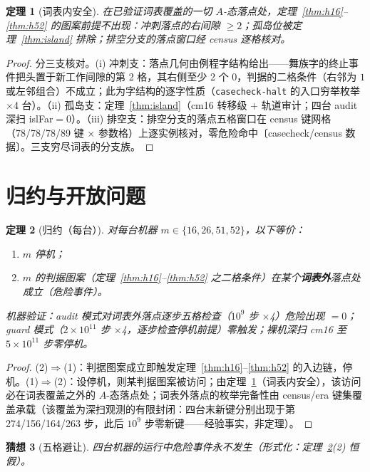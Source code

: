 \documentclass[11pt]{ctexart}
\newtheorem{theorem}{定理}[section]
\newtheorem{conjecture}[theorem]{猜想}
\begin{document}
\begin{theorem}[词表内安全]\label{thm:vocab}
在已验证词表覆盖的一切 $A$-态落点处，定理~\ref{thm:h16}--\ref{thm:h52} 的图案前提不出现：冲刺落点的右间隙 $\ge2$；孤岛位被定理~\ref{thm:island} 排除；排空分支的落点窗口经 census 逐格核对。
\end{theorem}
\begin{proof}
分三支核对。(i) 冲刺支：落点几何由例程字结构给出——舞族字的终止事件把头置于新工作间隙的第 2 格，其右侧至少 2 个 $0$，判据的二格条件（右邻为 $1$ 或左邻组合）不成立；此为字结构的逐字性质（\texttt{casecheck-halt} 的入口穷举枚举 $\times$4 台）。（ii) 孤岛支：定理~\ref{thm:island}（cm16 转移级 $+$ 轨道审计；四台 audit 深扫 islFar$=$0）。（iii) 排空支：排空分支的落点五格窗口在 census 键网格（78/78/78/89 键 $\times$ 参数格）上逐实例核对，零危险命中〔casecheck/census 数据〕。三支穷尽词表的分支族。
\end{proof}

\section{归约与开放问题}

\begin{theorem}[归约（每台）]\label{thm:reduction}
对每台机器 $m\in\{16,26,51,52\}$，以下等价：
\begin{enumerate}
\item $m$ 停机；
\item $m$ 的判据图案（定理~\ref{thm:h16}--\ref{thm:h52} 之二格条件）在某个\textbf{词表外}落点处成立（危险事件）。
\end{enumerate}
机器验证：audit 模式对词表外落点逐步五格检查（$10^9$ 步 $\times$4）危险出现 $=0$；guard 模式（$2\times10^{11}$ 步 $\times$4，逐步检查停机前提）零触发；裸机深扫 cm16 至 $5\times10^{11}$ 步零停机。
\end{theorem}
\begin{proof}
(2)$\Rightarrow$(1)：判据图案成立即触发定理~\ref{thm:h16}--\ref{thm:h52} 的入边链，停机。(1)$\Rightarrow$(2)：设停机，则某判据图案被访问；由定理~\ref{thm:vocab}（词表内安全），该访问必在词表覆盖之外的 $A$-态落点处；词表外落点的枚举完备性由 census/era 键集覆盖承载（该覆盖为深扫观测的有限封闭：四台末新键分别出现于第 274/156/164/263 步，此后 $10^9$ 步零新键——经验事实，非定理）。
\end{proof}

\begin{conjecture}[五格避让]\label{conj:quad}
四台机器的运行中危险事件永不发生（形式化：定理~\ref{thm:reduction}(2) 恒假）。
\end{conjecture}
\end{document}
